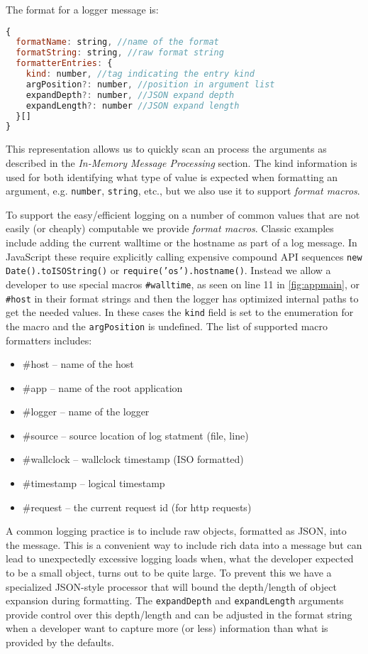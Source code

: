 \noindent
The format for a logger message is:
\begin{lstlisting}[language=JavaScript,basicstyle=\scriptsize]
{
  formatName: string, //name of the format
  formatString: string, //raw format string
  formatterEntries: {
    kind: number, //tag indicating the entry kind
    argPosition?: number, //position in argument list
    expandDepth?: number, //JSON expand depth
    expandLength?: number //JSON expand length
  }[]
}
\end{lstlisting}

This representation allows us to quickly scan an process the arguments as 
described in the \emph{In-Memory Message  Processing} section. The kind 
information is used for both identifying what type of value is expected 
when formatting an argument, e.g. \texttt{number}, \texttt{string}, etc., 
but we also use it to support \emph{format macros}.

To support the easy/efficient logging on a number of common values that 
are not easily (or cheaply) computable we provide \emph{format macros}. 
Classic examples include adding the current walltime or the hostname as 
part of a log message. In JavaScript these require explicitly calling 
expensive compound API sequences \texttt{new Date().toISOString()} or 
\texttt{require('os').hostname()}. Instead we allow a developer to use 
special macros \texttt{\#walltime}, as seen on line 11 in \autoref{fig:appmain}, 
or \texttt{\#host} in their format 
strings and then the logger has optimized internal paths to get the needed 
values. In these cases the \texttt{kind} field is set to the enumeration 
for the macro and the \texttt{argPosition} is undefined. The list of supported 
macro formatters includes:
\begin{itemize}
  \item \#host -- name of the host
  \item \#app -- name of the root application
  \item \#logger -- name of the logger
  \item \#source -- source location of log statment (file, line)
  \item \#wallclock -- wallclock timestamp (ISO formatted)
  \item \#timestamp -- logical timestamp
  \item \#request   -- the current request id (for http requests)
\end{itemize}

A common logging practice is to include raw objects, formatted as JSON, into the 
message. This is a convenient way to include rich data into a message but can 
lead to unexpectedly excessive logging loads when, what the developer expected to 
be a small object, turns out to be quite large. To prevent this we have a specialized 
JSON-style processor that will bound the depth/length of object expansion during 
formatting. The \texttt{expandDepth} and \texttt{expandLength} arguments provide 
control over this depth/length and can be adjusted in the format string when a 
developer want to capture more (or less) information than what is provided by the 
defaults.

